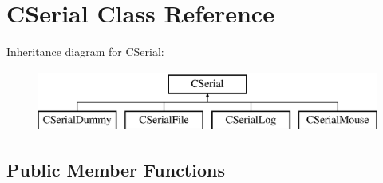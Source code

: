 \hypertarget{classCSerial}{\section{C\-Serial Class Reference}
\label{classCSerial}
}
Inheritance diagram for C\-Serial\-:\begin{figure}[H]
\begin{center}
\leavevmode
\includegraphics[height=2.000000cm]{classCSerial}
\end{center}
\end{figure}
\subsection*{Public Member Functions}
